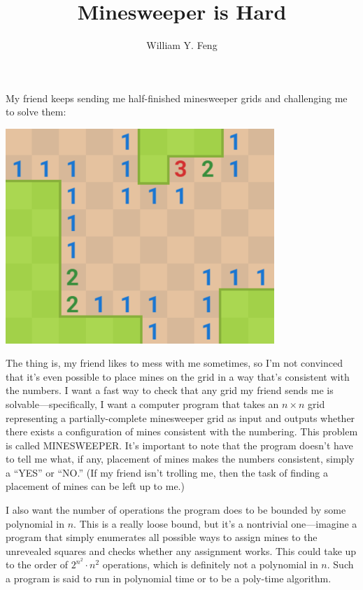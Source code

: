\documentclass{article}
\title{Minesweeper is Hard}
\author{William Y. Feng}
\begin{document}
\maketitle

My friend keeps sending me half-finished minesweeper grids and challenging me to solve them:
\begin{center}
    \includegraphics[width=4in]{images/Minesweeper_fig1.png}
\end{center}

The thing is, my friend likes to mess with me sometimes, so I’m not convinced that it’s even possible to place mines on the grid in a way that’s consistent with the numbers. I want a fast way to check that any grid my friend sends me is solvable---specifically, I want a computer program that takes an $n \times n$ grid representing a partially-complete minesweeper grid as input and outputs whether there exists a configuration of mines consistent with the numbering. This problem is called MINESWEEPER. It’s important to note that the program doesn’t have to tell me what, if any, placement of mines makes the numbers consistent, simply a  “YES” or “NO.” (If my friend isn’t trolling me, then the task of finding a placement of mines can be left up to me.)

I also want the number of operations the program does to be bounded by some polynomial in $n$. This is a really loose bound, but it’s a nontrivial one---imagine a program that simply enumerates all possible ways to assign mines to the unrevealed squares and checks whether any assignment works. This could take up to the order of $2^{n^2} \cdot n^2$ operations, which is definitely not a polynomial in $n$. Such a program is said to run in polynomial time or to be a poly-time algorithm.
\end{document}
